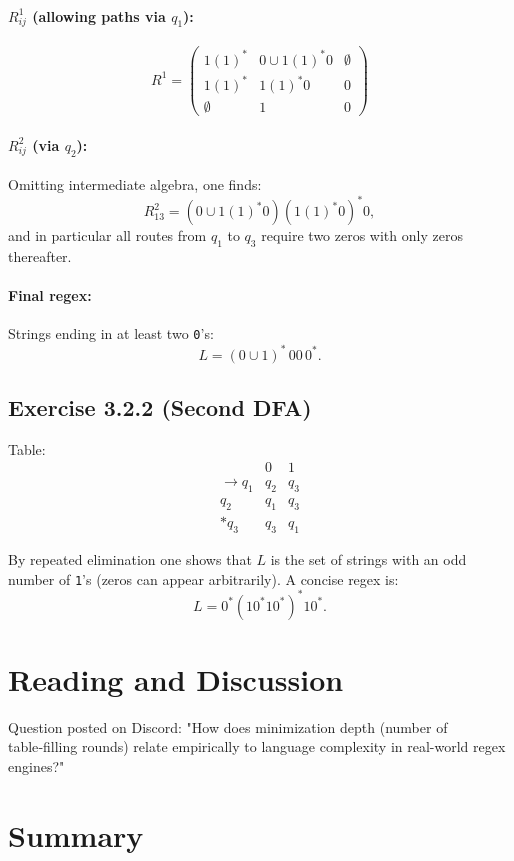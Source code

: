 \documentclass{article}
\begin{document}
\paragraph{$R^1_{ij}$ (allowing paths via $q_1$):}
\[
R^1=\begin{pmatrix}
1(1)^* & 0\cup1(1)^*0 & \emptyset\\
1(1)^* & 1(1)^*0      & 0\\
\emptyset & 1          & 0
\end{pmatrix}
\]

\paragraph{$R^2_{ij}$ (via $q_2$):}
Omitting intermediate algebra, one finds:
\[
R^2_{13} = (0\cup1(1)^*0)(1(1)^*0)^*0,
\]
and in particular all routes from $q_1$ to $q_3$ require two zeros with only zeros thereafter.

\paragraph{Final regex:}
Strings ending in at least two \texttt{0}'s:
$$L= (0\cup1)^*\,00\,0^*.
$$

\subsection*{Exercise 3.2.2 (Second DFA)}
Table:
\[\begin{array}{c|cc}
     & 0 & 1 \\
\hline
\to q_1 & q_2 & q_3 \\
 q_2    & q_1 & q_3 \\
\ast q_3& q_3 & q_1
\end{array}\]

By repeated elimination one shows that $L$ is the set of strings with an odd
number of \texttt{1}'s (zeros can appear arbitrarily).  A concise regex is:
$$L = 0^*(10^*10^*)^*10^*.
$$

\section*{Reading and Discussion}
Question posted on Discord:
"How does minimization depth (number of table‑filling rounds) relate
 empirically to language complexity in real-world regex engines?"

\section*{Summary}
\end{document}
